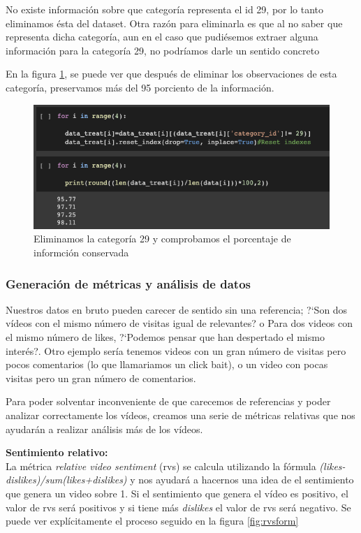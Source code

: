 \documentclass[a4paper,12pt]{article}
\begin{document}
No existe informaci\'on sobre que categor\'ia representa el id 29, por lo tanto eliminamos \'esta del dataset. Otra raz\'on para eliminarla es que al no saber que representa dicha categor\'ia, aun en el caso que pudi\'esemos extraer alguna informaci\'on para la categor\'ia 29, no podr\'iamos darle un sentido concreto

En la figura \ref{fig:cat29}, se puede ver que despu\'es de eliminar los observaciones de esta categor\'ia, preservamos m\'as del 95 porciento de la informaci\'on.

\begin{figure}[h!]
\centering
\includegraphics[width=13cm]{remove_category.png}
\caption{Eliminamos la categor\'ia 29 y comprobamos el porcentaje de informci\'on conservada}
\label{fig:cat29}
\end{figure}





\subsubsection[item_metricas]{Generaci\'on de m\'etricas y an\'alisis de datos}

Nuestros datos en bruto pueden carecer de sentido sin una referencia; ?`Son dos v\'ideos con el mismo n\'umero de visitas igual de relevantes? o Para dos videos con el mismo n\'umero de likes, ?`Podemos pensar que han despertado el mismo inter\'es?. Otro ejemplo ser\'ia tenemos videos con un gran n\'umero de visitas pero pocos comentarios (lo que llamariamos un click bait), o un video con pocas visitas pero un gran n\'umero de comentarios.

Para poder solventar inconveniente de que carecemos de referencias y poder analizar correctamente los v\'ideos, creamos una serie de m\'etricas relativas que nos ayudar\'an a realizar an\'alisis m\'as  de los v\'ideos.

\textbf{Sentimiento relativo:} \\
La m\'etrica {\itshape relative video sentiment} (rvs) se calcula utilizando la f\'ormula {\itshape (likes-dislikes)/sum(likes+dislikes)} y nos ayudar\'a a hacernos una idea de el sentimiento que genera un video sobre 1. Si el sentimiento que genera el v\'ideo es positivo, el valor de rvs ser\'a positivos y si tiene m\'as {\itshape dislikes} el valor de rvs ser\'a negativo. Se puede ver expl\'icitamente el proceso seguido en la figura \ref{fig:rvsform}
\end{document}
